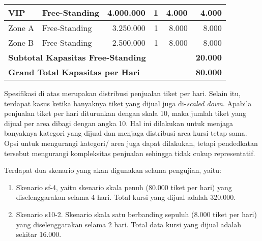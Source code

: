 \begin{longtable}{|l|l|r|r|r|r|}
    VIP & Free-Standing & 4.000.000 & 1 & 4.000 & 4.000 \\
    \hline
    Zone A & Free-Standing & 3.250.000 & 1 & 8.000 & 8.000 \\
    \hline
    Zone B & Free-Standing & 2.500.000 & 1 & 8.000 & 8.000 \\
    \hline
    \multicolumn{5}{|l|}{\textbf{Subtotal Kapasitas Free-Standing}} & \textbf{20.000} \\
    \hline \hline

    \multicolumn{5}{|l|}{\textbf{Grand Total Kapasitas per Hari}} & \textbf{80.000} \\

\end{longtable}
\endgroup

Spesifikasi di atas merupakan distribusi penjualan tiket per hari. Selain itu, terdapat kasus ketika banyaknya tiket yang dijual juga di-\textit{scaled down}. Apabila penjualan tiket per hari diturunkan dengan skala 10, maka jumlah tiket yang dijual per area dibagi dengan angka 10. Hal ini dilakukan untuk menjaga banyaknya kategori yang dijual dan menjaga distribusi area kursi tetap sama. Opsi untuk mengurangi kategori/ area juga dapat dilakukan, tetapi pendedkatan tersebut mengurangi kompleksitas penjualan sehingga tidak cukup representatif.

Terdapat dua skenario yang akan digunakan selama pengujian, yaitu:

\begin{enumerate}
    \item Skenario sf-4, yaitu skenario skala penuh (80.000 tiket per hari) yang diselenggarakan selama 4 hari. Total kursi yang dijual adalah 320.000.
    \item Skenario s10-2. Skenario skala satu berbanding sepuluh (8.000 tiket per hari) yang diselenggarakan selama 2 hari. Total data kursi yang dijual adalah sekitar 16.000.
\end{enumerate}